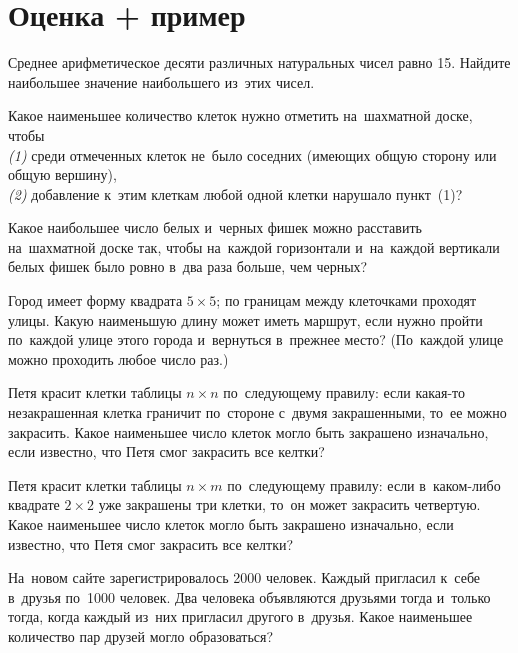 
\section*{Оценка + пример}


\begin{problems}

\item
Среднее арифметическое десяти различных натуральных чисел равно 15.
Найдите наибольшее значение наибольшего из~этих чисел.

\item
Какое наименьшее количество клеток нужно отметить на~шахматной доске, чтобы
\\
\emph{(1)}\enspace
среди отмеченных клеток не~было соседних
(имеющих общую сторону или общую вершину),
\\
\emph{(2)}\enspace
добавление к~этим клеткам любой одной клетки нарушало пункт~(1)?

\item
Какое наибольшее число белых и~черных фишек можно расставить на~шахматной доске
так, чтобы на~каждой горизонтали и~на~каждой вертикали белых фишек было ровно
в~два раза больше, чем черных?

\item
Город имеет форму квадрата $5 \times 5$;
по границам между клеточками проходят улицы.
Какую наименьшую длину может иметь маршрут, если нужно пройти по~каждой улице
этого города и~вернуться в~прежнее место?
(По~каждой улице можно проходить любое число раз.)


\item
Петя красит клетки таблицы $n \times n$ по~следующему правилу: если какая-то
незакрашенная клетка граничит по~стороне с~двумя закрашенными, то~ее можно
закрасить.
Какое наименьшее число клеток могло быть закрашено изначально, если известно,
что Петя смог закрасить все келтки?

\item
Петя красит клетки таблицы $n \times m$ по~следующему правилу: если
в~каком-либо квадрате $2 \times 2$ уже закрашены три клетки, то~он может
закрасить четвертую.
Какое наименьшее число клеток могло быть закрашено изначально, если известно,
что Петя смог закрасить все келтки?

\item
На~новом сайте зарегистрировалось 2000 человек.
Каждый пригласил к~себе в~друзья по~1000 человек.
Два человека объявляются друзьями тогда и~только тогда, когда каждый из~них
пригласил другого в~друзья.
Какое наименьшее количество пар друзей могло образоваться?

\end{problems}

